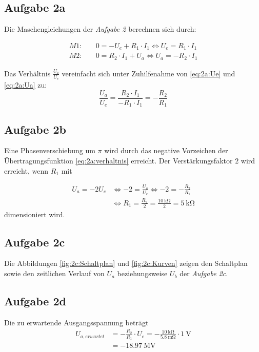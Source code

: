 \documentclass[
	journal,
	a4paper,
]{IEEEtran}
\newcommand{\aufgabe}[1]{\emph{Aufgabe #1}}
\begin{document}
	\subsection*{Aufgabe 2a}
	Die Maschengleichungen der \aufgabe{2} berechnen sich durch:
	
	\begin{align}
		M1:\quad &0=-U_e + R_1\cdot I_1 \Longleftrightarrow U_e=R_1\cdot I_1\label{eq:2a:Ue}\\
		M2:\quad &0=R_2\cdot I_1+U_a \Longleftrightarrow U_a=-R_2\cdot I_1\label{eq:2a:Ua}
	\end{align}
	
	Das Verhältnis \(\frac{U_a}{U_e}\) vereinfacht sich unter Zuhilfenahme von \eqref{eq:2a:Ue} und \eqref{eq:2a:Ua} zu:
	\begin{equation}
		\frac{U_a}{U_e}=\frac{R_2\cdot I_1}{-R_1\cdot I_1}=-\frac{R_2}{R_1}\label{eq:2a:verhaltnis}
	\end{equation}		
	
	\subsection*{Aufgabe 2b}
	Eine Phasenverschiebung um \(\pi\) wird durch das negative Vorzeichen der Übertragungsfunktion \eqref{eq:2a:verhaltnis} erreicht. Der Verstärkungsfaktor \(2\) wird erreicht, wenn \(R_1\) mit
	
	\begin{equation}
	\begin{split}
		U_a=-2U_e &\Longleftrightarrow -2=\frac{U_a}{U_e}\Longleftrightarrow -2=-\frac{R_2}{R_1}\\[1ex]
		&\Longleftrightarrow R_1=\frac{R_2}{2}=\frac{\SI{10}{\kilo\ohm}}{2}=\SI{5}{\kilo\ohm}
	\end{split}
	\end{equation}
	dimensioniert wird.
	
	\subsection*{Aufgabe 2c}
	Die Abbildungen \ref{fig:2c:Schaltplan} und \ref{fig:2c:Kurven} zeigen den Schaltplan sowie den zeitlichen Verlauf von \(U_a\) beziehungsweise \(U_b\) der \aufgabe{2c}.
	
	\subsection*{Aufgabe 2d}
	Die zu erwartende Ausgangsspannung beträgt 
	\begin{equation}
	\begin{split}
		U_{a,erwartet}&=-\frac{R_2}{R_1}\cdot U_e= -\frac{\SI{10}{\kilo\ohm}}{\SI{5.8}{\milli\ohm}}\cdot \SI{1}{\volt}\\
		&=-\SI{18.97}{\mega\volt}
	\end{split}
	\end{equation}		
	 
\end{document}
